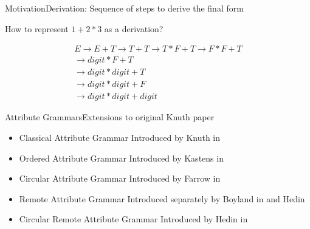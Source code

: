 \begin{frame}{Motivation}{Derivation: Sequence of steps to derive the final form}

How to represent $1 + 2 * 3$ as a derivation?

\begin{equation}
\begin{split}
E \rightarrow E + T
  \rightarrow T + T
  \rightarrow T * F + T
  \rightarrow F * F + T \\
  \rightarrow \mathit{digit} * F + T \\
  \rightarrow \mathit{digit} * \mathit{digit} + T \\
  \rightarrow \mathit{digit} * \mathit{digit} + F \\
  \rightarrow \mathit{digit} * \mathit{digit} + \mathit{digit}
\end{split}
\end{equation}

\end{frame}



\begin{frame}{Attribute Grammars}{Extensions to original Knuth paper}

\begin{itemize}
    \item \alert{Classical Attribute Grammar} Introduced by Knuth in \cite{Knuth68semanticsof}
    \item \alert{Ordered} Attribute Grammar Introduced by Kastens in \cite{10.1007/BF00288644}
    \item \alert{Circular} Attribute Grammar Introduced by Farrow in \cite{10.1145/13310.13320}
    \item \alert{Remote} Attribute Grammar Introduced separately by Boyland in \cite{Boyland05remoteattribute} and Hedin \cite{DBLP:journals/informaticaSI/Hedin00}
    \item \alert{Circular Remote} Attribute Grammar Introduced by Hedin in \cite{10.1016/j.scico.2005.06.005}
\end{itemize}
	
\end{frame}
